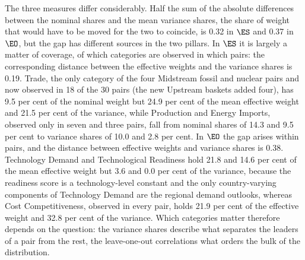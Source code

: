 The three measures differ considerably. Half the sum of the absolute differences between the
nominal shares and the mean variance shares, the share of weight that would have to be moved
for the two to coincide, is 0.32 in $\ES$ and 0.37 in $\EO$, but the gap has different sources
in the two pillars. In $\ES$ it is largely a matter of coverage, of which categories are
observed in which pairs: the corresponding distance between the effective weights and the
variance shares is 0.19. Trade, the only category of the four Midstream fossil and nuclear
pairs and now observed in 18 of the 30 pairs (the new Upstream baskets added four), has
9.5 per cent of the nominal weight but 24.9 per cent of the mean effective weight and 21.5 per
cent of the variance, while Production and Energy Imports, observed only in seven and three
pairs, fall from nominal shares of 14.3 and 9.5 per cent to variance shares of 10.0 and
2.8 per cent. In $\EO$ the gap arises within pairs, and the distance between effective weights
and variance shares is 0.38. Technology Demand and Technological Readiness hold 21.8 and 14.6
per cent of the mean effective weight but 3.6 and 0.0 per cent of the variance, because the
readiness score is a technology-level constant and the only country-varying components of
Technology Demand are the regional demand outlooks, whereas Cost Competitiveness, observed in
every pair, holds 21.9 per cent of the effective weight and 32.8 per cent of the variance. Which
categories matter therefore depends on the question: the variance shares describe what
separates the leaders of a pair from the rest, the leave-one-out correlations what orders the
bulk of the distribution.




